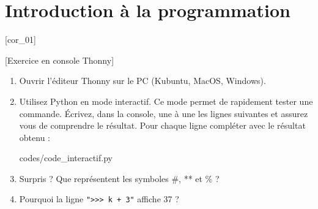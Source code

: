 \documentclass[a4paper,12pt]{article}
\newcommand{\numero}{0}                                    %
\begin{document}

\setcounter{section}{\numero}

\section{Introduction à la programmation}				
[cor_01]

\exo{}[Exercice en console Thonny]  ~\\ 
\begin{enumerate}
	\item Ouvrir l'éditeur Thonny sur le PC (Kubuntu, MacOS, Windows).
	\item Utilisez Python en mode interactif. Ce mode permet de rapidement tester une commande. Écrivez, dans la console, une à une les lignes suivantes et assurez vous de comprendre le résultat. Pour chaque ligne compléter avec le résultat obtenu :
	
	{codes/code_interactif.py}
	\item Surpris ? 
	        Que représentent les symboles \#, ** et \% ?
	\item Pourquoi la ligne \texttt{">>> k + 3"} affiche 37 ?
\end{enumerate}
\begin{correction}
	~\\ \vspace{-5pt}
	
\end{correction}

\finexo
\end{document}
